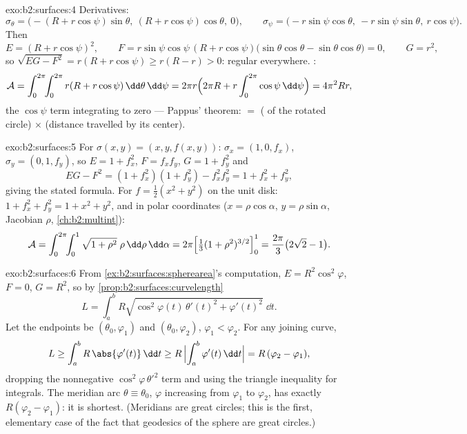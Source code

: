 \begin{solution}{exo:b2:surfaces:4}
Derivatives:
\[
\sigma_\theta = \bigl(-(R + r\cos\psi)\sin\theta,\
(R + r\cos\psi)\cos\theta,\ 0\bigr),
\qquad
\sigma_\psi = \bigl(-r\sin\psi\cos\theta,\
-r\sin\psi\sin\theta,\ r\cos\psi\bigr).
\]
Then
\[
E = (R + r\cos\psi)^2,
\qquad
F = r\sin\psi\cos\psi\,(R + r\cos\psi)
\bigl(\sin\theta\cos\theta - \sin\theta\cos\theta\bigr) = 0,
\qquad
G = r^2 ,
\]
so $\sqrt{EG - F^2} = r(R + r\cos\psi) \geq r(R - r) > 0$:
regular everywhere. :
\[
\mathcal{A}
= \int_0^{2\pi}\!\!\int_0^{2\pi} r(R + r\cos\psi)
\,\dd\theta\,\dd\psi
= 2\pi r \Bigl(2\pi R + r\int_0^{2\pi}\cos\psi\,\dd\psi\Bigr)
= 4\pi^2 R r ,
\]
the $\cos\psi$ term integrating to zero --- Pappus' theorem: 
$=$ ( of the rotated circle) $\times$ (distance travelled by
its center).
\end{solution}

\begin{solution}{exo:b2:surfaces:5}
For $\sigma(x, y) = (x, y, f(x,y))$: $\sigma_x = (1, 0, f_x)$,
$\sigma_y = (0, 1, f_y)$, so $E = 1 + f_x^2$, $F = f_xf_y$, $G = 1
+ f_y^2$ and
\[
EG - F^2 = (1 + f_x^2)(1 + f_y^2) - f_x^2f_y^2
= 1 + f_x^2 + f_y^2 ,
\]
giving the stated  formula. For $f = \frac12(x^2 + y^2)$ on
the unit disk: $1 + f_x^2 + f_y^2 = 1 + x^2 + y^2$, and in polar
coordinates ($x = \rho\cos\alpha$, $y = \rho\sin\alpha$, Jacobian
$\rho$, \cref{ch:b2:multint}):
\[
\mathcal{A}
= \int_0^{2\pi}\!\!\int_0^1 \sqrt{1 + \rho^2}\;\rho
\,\dd\rho\,\dd\alpha
= 2\pi\Bigl[\tfrac13(1 + \rho^2)^{3/2}\Bigr]_0^1
= \frac{2\pi}{3}\bigl(2\sqrt2 - 1\bigr).
\]
\end{solution}

\begin{solution}{exo:b2:surfaces:6}
From \cref{ex:b2:surfaces:spherearea}'s computation, $E =
R^2\cos^2\varphi$, $F = 0$, $G = R^2$, so by
\cref{prop:b2:surfaces:curvelength}
\[
L = \int_a^b R\sqrt{\cos^2\varphi(t)\,\theta'(t)^2
+ \varphi'(t)^2}\;\dd t .
\]
Let the endpoints be $(\theta_0, \varphi_1)$ and $(\theta_0,
\varphi_2)$, $\varphi_1 < \varphi_2$. For any joining curve,
\[
L \geq \int_a^b R\,\abs{\varphi'(t)}\,\dd t
\geq R\,\Bigl|\int_a^b \varphi'(t)\,\dd t\Bigr|
= R\,(\varphi_2 - \varphi_1),
\]
dropping the nonnegative $\cos^2\varphi\,\theta'^2$ term and using
the triangle inequality for integrals. The meridian arc
$\theta \equiv \theta_0$, $\varphi$ increasing from $\varphi_1$ to
$\varphi_2$, has \omterm{def:b2:curves:length}{length} exactly $R(\varphi_2 - \varphi_1)$: it is
shortest. (Meridians are great circles; this is the first,
elementary case of the fact that geodesics of the sphere are great
circles.)
\end{solution}

